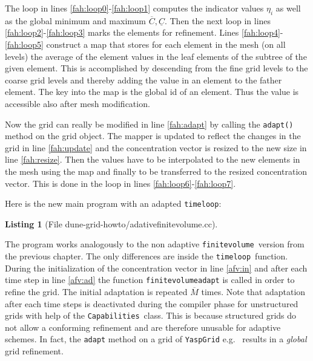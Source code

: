 \documentclass[11pt,a4paper,headinclude,footinclude,DIV16,normalheadings]{scrreprt}
\newtheorem{lst}{Listing}
\begin{document}
The loop in lines \ref{fah:loop0}-\ref{fah:loop1} computes the
indicator values $\eta_i$ as well as the global minimum and maximum
$\overline{C},\underline{C}$. Then the next loop in lines
\ref{fah:loop2}-\ref{fah:loop3} marks the elements for refinement.
Lines \ref{fah:loop4}-\ref{fah:loop5} construct a map that stores for
each element in the mesh (on all levels) the average of the element
values in the leaf elements of the subtree of the given element. This
is accomplished by descending from the fine grid levels to the coarse
grid levels and thereby adding the value in an element to the father
element. The key into the map is the global id of an element. Thus the
value is accessible also after mesh modification.

Now the grid can really be modified in line \ref{fah:adapt} by calling the
\lstinline!adapt()! method on the grid object. The mapper is updated
to reflect the changes in the grid in line \ref{fah:update} and the
concentration vector is resized to the new size in line
\ref{fah:resize}. Then the values have to be interpolated to the new
elements in the mesh using the map and finally to be transferred to
the resized concentration vector. This is done in the loop in lines
\ref{fah:loop6}-\ref{fah:loop7}.

Here is the new main program with an adapted \lstinline!timeloop!:

\begin{lst}[File dune-grid-howto/adativefinitevolume.cc] \mbox{}
\nopagebreak

\end{lst}

The program works analogously to the non adaptive \lstinline!finitevolume!\
version from the previous chapter. The only differences are inside the
\lstinline!timeloop!\ function. During the initialization of the concentration
vector in line \ref{afv:in} and after each time step in line \ref{afv:ad} the
function \lstinline!finitevolumeadapt! is called in order to refine the grid.
The initial adaptation is repeated $\overline{M}$ times.  Note that adaptation
after each time steps is deactivated during the compiler phase for unstructured
grids with help of the \lstinline!Capabilities!\ class. This is because
structured grids do not allow a conforming refinement and are therefore
unusable for adaptive schemes. In fact, the \lstinline!adapt! method on a grid
of \lstinline!YaspGrid! e.g.~ results in a {\em global} grid refinement.
\end{document}

